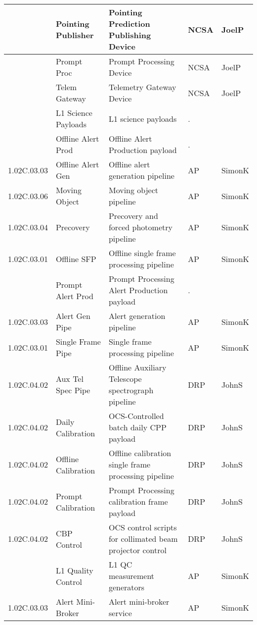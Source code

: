 \begin{longtable}{|p{}|p{}|p{}|p{}|p{}|}
{\tiny } & \small Pointing Publisher & Pointing Prediction Publishing Device & NCSA & JoelP\\ \hline 
{\tiny } & \small Prompt Proc & Prompt Processing Device & NCSA & JoelP\\ \hline 
{\tiny } & \small Telem Gateway & Telemetry Gateway Device & NCSA & JoelP\\ \hline 
{\tiny } & \small L1 Science Payloads & L1 science payloads & . & \\ \hline 
{\tiny } & \small Offline Alert Prod & Offline Alert Production payload & . & \\ \hline 
{\tiny 1.02C.03.03} & \small Offline Alert Gen & Offline alert generation pipeline & AP & SimonK\\ \hline 
{\tiny 1.02C.03.06} & \small Moving Object & Moving object pipeline & AP & SimonK\\ \hline 
{\tiny 1.02C.03.04} & \small Precovery & Precovery and forced photometry pipeline & AP & SimonK\\ \hline 
{\tiny 1.02C.03.01} & \small Offline SFP & Offline single frame processing pipeline & AP & SimonK\\ \hline 
{\tiny } & \small Prompt Alert Prod & Prompt Processing Alert Production payload & . & \\ \hline 
{\tiny 1.02C.03.03} & \small Alert Gen Pipe & Alert generation pipeline & AP & SimonK\\ \hline 
{\tiny 1.02C.03.01} & \small Single Frame Pipe & Single frame processing pipeline & AP & SimonK\\ \hline 
{\tiny 1.02C.04.02} & \small Aux Tel Spec Pipe & Offline Auxiliary Telescope spectrograph pipeline & DRP & JohnS\\ \hline 
{\tiny 1.02C.04.02} & \small Daily Calibration & OCS-Controlled batch daily CPP payload & DRP & JohnS\\ \hline 
{\tiny 1.02C.04.02} & \small Offline Calibration & Offline calibration single frame processing pipeline & DRP & JohnS\\ \hline 
{\tiny 1.02C.04.02} & \small Prompt Calibration & Prompt Processing calibration frame payload & DRP & JohnS\\ \hline 
{\tiny 1.02C.04.02} & \small CBP Control & OCS control scripts for collimated beam projector control & DRP & JohnS\\ \hline 
{\tiny } & \small L1 Quality Control & L1 QC measurement generators & AP & SimonK\\ \hline 
{\tiny 1.02C.03.03} & \small Alert Mini-Broker & Alert mini-broker service & AP & SimonK\\ \hline 

\end{longtable}
